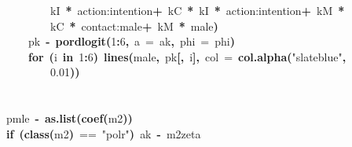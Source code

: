 \documentclass{article}
\makeatletter
\newcommand{\hlnumber}[1]{\textcolor[rgb]{0,0,0}{#1}}%
\newcommand{\hlfunctioncall}[1]{\textcolor[rgb]{.5,0,.33}{\textbf{#1}}}%
\newcommand{\hlstring}[1]{\textcolor[rgb]{.6,.6,1}{#1}}%
\newcommand{\hlkeyword}[1]{\textbf{#1}}%
\newcommand{\hlargument}[1]{\textcolor[rgb]{.69,.25,.02}{#1}}%
\newcommand{\hlassignement}[1]{\textbf{#1}}%
\newcommand{\hlsymbol}[1]{#1}%
\newcommand{\hlstd}[1]{\textcolor[rgb]{0,0,0}{#1}}%
\newenvironment{kframe}{%
 \def\FrameCommand##1{\hskip\@totalleftmargin \hskip-\fboxsep
 \colorbox{shadecolor}{##1}\hskip-\fboxsep
     \hskip-\linewidth \hskip-\@totalleftmargin \hskip\columnwidth}%
 \MakeFramed {\advance\hsize-\width
   \@totalleftmargin\z@ \linewidth\hsize
   \@setminipage}}%
 {\par\unskip\endMakeFramed}
\newenvironment{knitrout}{}{} %
\makeatother
\begin{document}
\begin{knitrout}
{\begin{kframe}
\begin{flushleft}
\hlstd{}{\ }{\ }{\ }{\ }{\ }{\ }{\ }{\ }\hlsymbol{kI}{\ }\hlkeyword{*}{\ }\hlsymbol{\usebox{\hlnormalsizeboxbacktick}action:intention\usebox{\hlnormalsizeboxbacktick}}{\ }\hlkeyword{+}{\ }\hlsymbol{kC}{\ }\hlkeyword{*}{\ }\hlsymbol{kI}{\ }\hlkeyword{*}{\ }\hlsymbol{\usebox{\hlnormalsizeboxbacktick}action:intention\usebox{\hlnormalsizeboxbacktick}}{\ }\hlkeyword{+}{\ }\hlsymbol{kM}{\ }\hlkeyword{*}\hspace*{\fill}\\
\hlstd{}{\ }{\ }{\ }{\ }{\ }{\ }{\ }{\ }\hlsymbol{kC}{\ }\hlkeyword{*}{\ }\hlsymbol{\usebox{\hlnormalsizeboxbacktick}contact:male\usebox{\hlnormalsizeboxbacktick}}{\ }\hlkeyword{+}{\ }\hlsymbol{kM}{\ }\hlkeyword{*}{\ }\hlsymbol{male}\hlkeyword{)}\hspace*{\fill}\\
\hlstd{}{\ }{\ }{\ }{\ }\hlsymbol{pk}{\ }\hlassignement{\usebox{\hlnormalsizeboxlessthan}-}{\ }\hlfunctioncall{pordlogit}\hlkeyword{(}\hlnumber{1}\hlkeyword{:}\hlnumber{6}\hlkeyword{,}{\ }\hlargument{a}{\ }\hlargument{=}{\ }\hlsymbol{ak}\hlkeyword{,}{\ }\hlargument{phi}{\ }\hlargument{=}{\ }\hlsymbol{phi}\hlkeyword{)}\hspace*{\fill}\\
\hlstd{}{\ }{\ }{\ }{\ }\hlkeyword{for}{\ }\hlkeyword{(}\hlsymbol{i}{\ }\hlkeyword{in}{\ }\hlnumber{1}\hlkeyword{:}\hlnumber{6}\hlkeyword{)}{\ }\hlfunctioncall{lines}\hlkeyword{(}\hlsymbol{male}\hlkeyword{,}{\ }\hlsymbol{pk}\hlkeyword{[}\hlkeyword{,}{\ }\hlsymbol{i}\hlkeyword{]}\hlkeyword{,}{\ }\hlargument{col}{\ }\hlargument{=}{\ }\hlfunctioncall{col.alpha}\hlkeyword{(}\hlstring{"{}slateblue"{}}\hlkeyword{,}\hspace*{\fill}\\
\hlstd{}{\ }{\ }{\ }{\ }{\ }{\ }{\ }{\ }\hlnumber{0.01}\hlkeyword{)}\hlkeyword{)}\hspace*{\fill}\\
\hlstd{}\hlkeyword{\usebox{\hlnormalsizeboxclosebrace}}\hspace*{\fill}\\
\hlstd{}\hspace*{\fill}\\
\hlstd{}\hlsymbol{pmle}{\ }\hlassignement{\usebox{\hlnormalsizeboxlessthan}-}{\ }\hlfunctioncall{as.list}\hlkeyword{(}\hlfunctioncall{coef}\hlkeyword{(}\hlsymbol{m2}\hlkeyword{)}\hlkeyword{)}\hspace*{\fill}\\
\hlstd{}\hlkeyword{if}{\ }\hlkeyword{(}\hlfunctioncall{class}\hlkeyword{(}\hlsymbol{m2}\hlkeyword{)}{\ }=={\ }\hlstring{"{}polr"{}}\hlkeyword{)}{\ }\hlsymbol{ak}{\ }\hlassignement{\usebox{\hlnormalsizeboxlessthan}-}{\ }\hlsymbol{m2}\hlkeyword{\usebox{\hlnormalsizeboxdollar}}\hlsymbol{zeta}\hspace*{\fill}\\

\end{flushleft}
\end{kframe}}
\end{knitrout}
\end{document}
